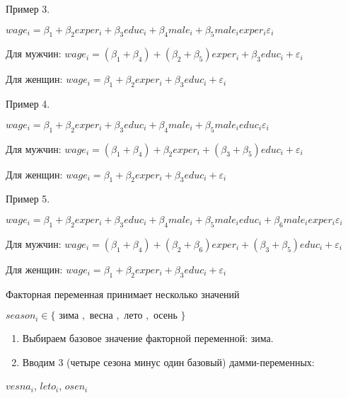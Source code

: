 \documentclass[ignorenonframetext,]{beamer}
\begin{document}
\begin{frame}{Пример 3.}

$wage_i = \beta_1 + \beta_2 exper_i + \beta_3 educ_i + \beta_4 male_i + \beta_5 male_i exper_i \varepsilon_i$

Для мужчин:
$wage_i = (\beta_1+\beta_4) + (\beta_2+\beta_5) exper_i + \beta_3 educ_i + \varepsilon_i$

Для женщин:
$wage_i = \beta_1 + \beta_2 exper_i + \beta_3 educ_i + \varepsilon_i$

\end{frame}

\begin{frame}{Пример 4.}

$wage_i = \beta_1 + \beta_2 exper_i + \beta_3 educ_i + \beta_4 male_i + \beta_5 male_i educ_i \varepsilon_i$

Для мужчин:
$wage_i = (\beta_1+\beta_4) + \beta_2 exper_i + (\beta_3 + \beta_5) educ_i + \varepsilon_i$

Для женщин:
$wage_i = \beta_1 + \beta_2 exper_i + \beta_3 educ_i + \varepsilon_i$

\end{frame}

\begin{frame}{Пример 5.}

$wage_i = \beta_1 + \beta_2 exper_i + \beta_3 educ_i + \beta_4 male_i + \beta_5 male_i educ_i + \beta_6 male_i exper_i \varepsilon_i$

Для мужчин:
$wage_i = (\beta_1+\beta_4) + (\beta_2 + \beta_6) exper_i + (\beta_3 + \beta_5) educ_i + \varepsilon_i$

Для женщин:
$wage_i = \beta_1 + \beta_2 exper_i + \beta_3 educ_i + \varepsilon_i$

\end{frame}

\begin{frame}{Факторная переменная принимает несколько значений}

$season_i \in \{\text{ зима }, \text{ весна }, \text{ лето }, \text{ осень }  \}$

\begin{enumerate}
\def\labelenumi{\arabic{enumi}.}
\item
  Выбираем базовое значение факторной переменной: зима.
\item
  Вводим 3 (четыре сезона минус один базовый) дамми-переменных:
\end{enumerate}

$vesna_i$, $leto_i$, $osen_i$

\end{frame}
\end{document}
